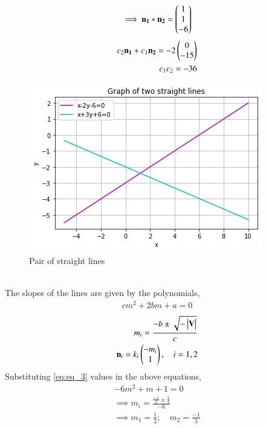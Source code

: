 \documentclass[journal,12pt,twocolumn]{IEEEtran}
\begin{document}
\begin{align}
    \implies \mathbf{n_1} * \mathbf{n_2} = \begin{pmatrix}1 \\ 1 \\ -6\end{pmatrix} \label{eq:eq_10} 
\end{align}    
\begin{align}
    c_2\mathbf{n_1}+c_1\mathbf{n_2} = -2\begin{pmatrix}0 \\ -15\end{pmatrix} \label{eq:eq_11} \\
    c_1c_2 = -36 \label{eq:eq_12}
\end{align}
\renewcommand{\thefigure}{1}
\begin{figure}[h!]
    \centering
    \includegraphics[width=\columnwidth]{Assignment_6_Plot.png}
    \caption{Pair of straight lines}
    \label{Fig:1}
\end{figure} \\
The slopes of the lines are given by the polynomials,
\begin{align}
    cm^2+2bm+a=0 \nonumber
\end{align}
\begin{align}
    m_i = \frac{-b\pm \sqrt{-\begin{vmatrix}\mathbf{V}\end{vmatrix}}}{c} \label{eq:eq_13} \\
    \mathbf{n}_i = k_i\begin{pmatrix}-m_i \\ 1\end{pmatrix}, \quad i=1,2 \label{eq:eq_14}
\end{align}
Substituting \eqref{eq:eq_3} values in the above equations,
\begin{align}
    -6m^2+m+1=0 \nonumber \\
    \implies m_i = \frac{\frac{-1}{2}\pm \frac{5}{2}}{-6} \nonumber \\
    \implies m_1 = \frac{1}{2}; \quad m_2 = \frac{-1}{3} \label{eq:eq_15}
\end{align}
\end{document}
